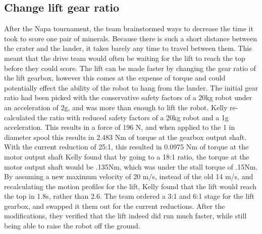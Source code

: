 \documentclass{article}
\begin{document}
\subsection{Change lift gear ratio}
After the Napa tournament, the team brainstormed ways to decrease the time it took to score one pair of minerals. 
Because there is such a short distance between the crater and the lander, it takes barely any time to travel between them. 
This meant that the drive team would often be waiting for the lift to reach the top before they could score.
The lift can be made faster by changing the gear ratio of the lift gearbox, however this comes at the expense of torque and could potentially effect the ability of the robot to hang from the lander.
The initial gear ratio had been picked with the conservative safety factors of a 20kg robot under an acceleration of 2g, and was more than enough to lift the robot. 
Kelly re-calculated the ratio with reduced safety factors of a 20kg robot and a 1g acceleration. 
This results in a force of 196 N, and when applied to the 1 in diameter spool this results in 2.483 Nm of torque at the gearbox output shaft.
With the current reduction of 25:1, this resulted in 0.0975 Nm of torque at the motor output shaft
Kelly found that by going to a 18:1 ratio, the torque at the motor output shaft would be .135Nm, which was under the stall torque of .15Nm.
By assuming a new maximum velocity of 20 m/s, instead of the old 14 m/s, and recalculating the motion profiles for the lift, Kelly found that the lift would reach the top in 1.8s, rather than 2.6.
The team ordered a 3:1 and 6:1 stage for the lift gearbox, and swapped it them out for the current reductions.
After the modifications, they verified that the lift indeed did run much faster, while still being able to raise the robot off the ground. 
\end{document}
